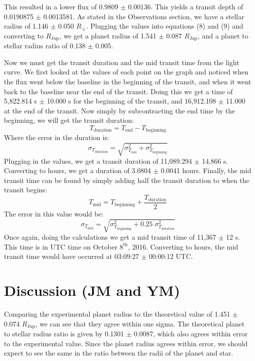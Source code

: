\documentclass{aastex61}
\begin{document}
This resulted in a lower flux of 0.9809 $\pm$ 0.00136. This yields a transit depth of 0.0190875 $\pm$ 0.0013581. As stated in the Observations section, we have a stellar radius of 1.146 $\pm$ 0.050 $R_{\sun}$. Plugging the values into equations (8) and (9) and converting to $R_{\text{Jup}}$, we get a planet radius of 1.541 $\pm$ 0.087 $R_{\text{Jup}}$, and a planet to stellar radius ratio of 0.138 $\pm$ 0.005. 

Now we must get the transit duration and the mid transit time from the light curve. We first looked at the values of each point on the graph and noticed when the flux went below the baseline in the beginning of the transit, and when it went back to the baseline near the end of the transit. Doing this we get a time of 5,822.814 s $\pm$ 10.000 s for the beginning of the transit, and 16,912.108  $\pm$ 11.000 at the end of the transit. Now simply by subcontracting the end time by the beginning, we will get the transit duration:
\begin{equation}
	T_{\text{duration}} = T_{\text{end}} - T_{\text{beginning}}
\end{equation}
Where the error in the duration is:
\begin{equation}
	\sigma_{T_{\text{duration}}} = \sqrt{\sigma_{T_{\text{end}}}^{2}+\sigma_{T_{\text{beginning}}}^{2}}
\end{equation}
Plugging in the values, we get a transit duration of 11,089.294 $\pm$ 14.866 s. Converting to hours, we get a duration of 3.0804 $\pm$ 0.0041 hours. Finally, the mid transit time can be found by simply adding half the transit duration to when the transit begins:
\begin{equation}
	T_{\text{mid}} = T_{\text{beginning}} +\frac{T_{\text{duration}}}{2}
\end{equation}
The error in this value would be:
\begin{equation}
	\sigma_{T_{\text{mid}}} = \sqrt{\sigma_{T_{\text{beginning}}}^{2}+0.25 \; \sigma_{T_{\text{duration}}}^{2}}
\end{equation}
Once again, doing the calculations we get a mid transit time of 11,367 $\pm$ 12 s. This time is in UTC time on October $8^{\text{th}}$, 2016. Converting to hours, the mid transit time would have occurred at 03:09:27 $\pm$ 00:00:12 UTC. 

\section{Discussion (JM and YM)}
Comparing the experimental planet radius to the theoretical value of 1.451 $\pm$ 0.074 $R_{\text{Jup}}$, we can see that they agree within one sigma. The theoretical planet to stellar radius ratio is given by 0.1301 $\pm$ 0.0087, which also agrees within error to the experimental value. Since the planet radius agrees within error, we should expect to see the same in the ratio between the radii of the planet and star. 
\end{document}
